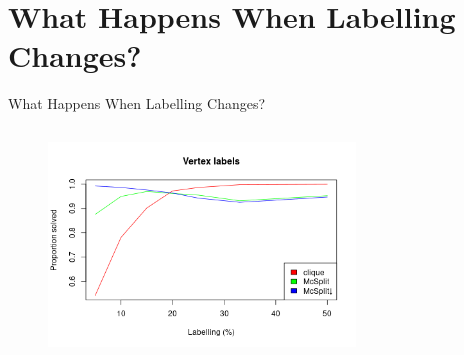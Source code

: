 \documentclass{beamer}
\begin{document}
\section{What Happens When Labelling Changes?}

\begin{frame}{What Happens When Labelling Changes?}
  \begin{columns}
    \begin{column}{0.5\textwidth}
      \begin{figure}
        \centering
        \includegraphics[width=0.9\textwidth]{../dissertation/images/vertex_labels_linechart.png}
      \end{figure}
    \end{column}
    \begin{column}{0.5\textwidth}
      \begin{figure}
        \centering

\end{figure}
\end{column}
\end{columns}
\end{frame}
\end{document}
